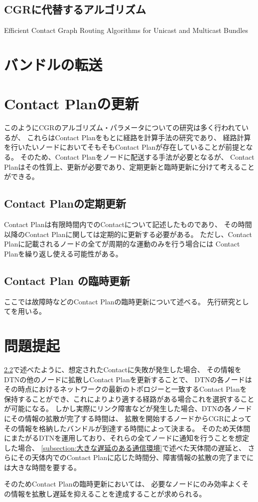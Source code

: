 \subsection{CGRに代替するアルゴリズム}
\label{subsection:CGRに代替するアルゴリズムの研究}
Efficient Contact Graph Routing Algorithms for Unicast and Multicast Bundles
\cite{DeJonckere2019}

\section{バンドルの転送}
\label{section:バンドルの転送}


\section{Contact Planの更新}
\label{sec:ContactPlanの更新}
このようにCGRのアルゴリズム・パラメータについての研究は多く行われているが、
これらはContact Planをもとに経路を計算手法の研究であり、
経路計算を行いたいノードにおいてそもそもContact Planが存在していることが前提となる。
そのため、Contact Planをノードに配送する手法が必要となるが、
Contact Planはその性質上、更新が必要であり、定期更新と臨時更新に分けて考えることができる。

\subsection{Contact Planの定期更新}
\label{sec:ContactPlanの定期更新}
Contact Planは有限時間内でのContactについて記述したものであり、
その時間以降のContact Planに関しては定期的に更新する必要がある。
ただし、Contact Planに記載されるノードの全てが周期的な運動のみを行う場合には
Contact Planを繰り返し使える可能性がある。

\subsection{Contact Plan の臨時更新}
\label{sec:ContactPlanの臨時更新}
ここでは故障時などのContact Planの臨時更新について述べる。
先行研究として\cite{Bezirgiannidis2013}を用いる。

\section{問題提起}
\label{sec:ContactPlanの臨時更新の課題}
\ref{sec:ContactPlanの臨時更新}で述べたように、想定されたContactに失敗が発生した場合、
その情報をDTNの他のノードに拡散しContact Planを更新することで、
DTNの各ノードはその時点におけるネットワークの最新のトポロジーと一致するContact Planを
保持することができ、これによりより適する経路がある場合これを選択することが可能になる。
しかし実際にリンク障害などが発生した場合、DTNの各ノードにその情報の拡散が完了する時間は、
拡散を開始するノードからCGRによってその情報を格納したバンドルが到達する時間によって決まる。
そのため天体間にまたがるDTNを運用しており、それらの全てノードに通知を行うことを想定した場合、
\ref{subsection:大きな遅延のある通信環境}で述べた天体間の遅延と、
さらにその天体内でのContact Planに応じた時間分、障害情報の拡散の完了までには大きな時間を要する。

そのためContact Planの臨時更新においては、
必要なノードにのみ効率よくその情報を拡散し遅延を抑えることを達成することが求められる。